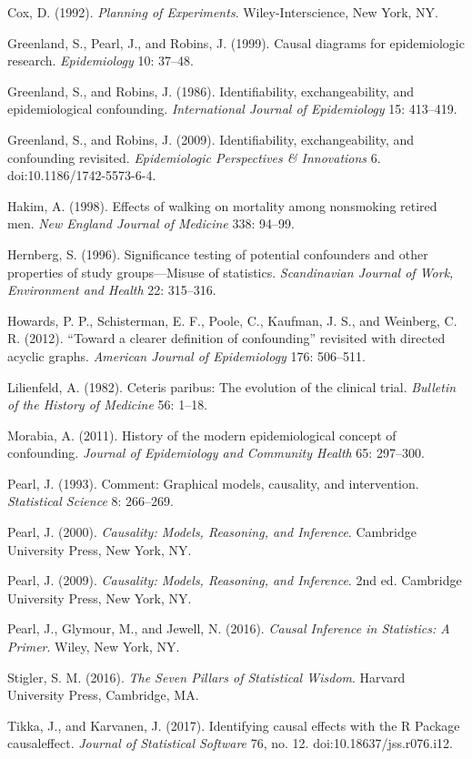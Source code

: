 \documentclass[11pt,a5paper,twoside]{book}
\begin{document}
Cox, D. (1992). \textit{Planning of Experiments}. Wiley-Interscience, New York, NY.

Greenland, S., Pearl, J., and Robins, J. (1999). Causal diagrams for epidemiologic research. \textit{Epidemiology} 10: 37–48.

Greenland, S., and Robins, J. (1986). Identifiability, exchangeability, and epidemiological confounding. \textit{International Journal of Epidemiology} 15: 413–419.

Greenland, S., and Robins, J. (2009). Identifiability, exchangeability, and confounding revisited. \textit{Epidemiologic Perspectives \& Innovations} 6. doi:10.1186/1742-5573-6-4.

Hakim, A. (1998). Effects of walking on mortality among nonsmoking retired men. \textit{New England Journal of Medicine} 338: 94–99.

Hernberg, S. (1996). Significance testing of potential confounders and other properties of study groups—Misuse of statistics. \textit{Scandinavian Journal of Work, Environment and Health} 22: 315–316.

Howards, P. P., Schisterman, E. F., Poole, C., Kaufman, J. S., and Weinberg, C. R. (2012). “Toward a clearer definition of confounding” revisited with directed acyclic graphs. \textit{American Journal of Epidemiology} 176: 506–511.

Lilienfeld, A. (1982). Ceteris paribus: The evolution of the clinical trial. \textit{Bulletin of the History of Medicine} 56: 1–18.

Morabia, A. (2011). History of the modern epidemiological concept of confounding. \textit{Journal of Epidemiology and Community Health} 65: 297–300.

Pearl, J. (1993). Comment: Graphical models, causality, and intervention. \textit{Statistical Science} 8: 266–269.

Pearl, J. (2000). \textit{Causality: Models, Reasoning, and Inference}. Cambridge University Press, New York, NY.

Pearl, J. (2009). \textit{Causality: Models, Reasoning, and Inference}. 2nd ed. Cambridge University Press, New York, NY.

Pearl, J., Glymour, M., and Jewell, N. (2016). \textit{Causal Inference in Statistics: A Primer}. Wiley, New York, NY.

Stigler, S. M. (2016). \textit{The Seven Pillars of Statistical Wisdom}. Harvard University Press, Cambridge, MA.

Tikka, J., and Karvanen, J. (2017). Identifying causal effects with the R Package causaleffect. \textit{Journal of Statistical Software} 76, no. 12. doi:10.18637/jss.r076.i12.
\end{document}
